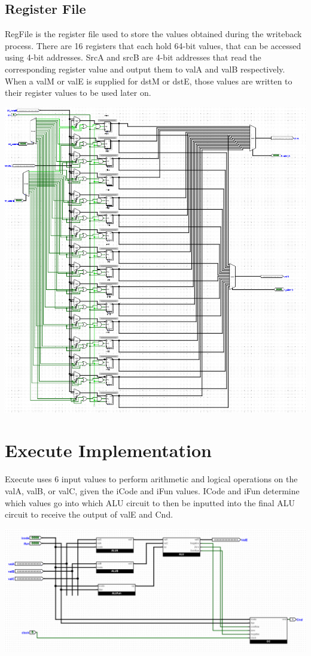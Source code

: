 \documentclass{article}
\begin{document}
\subsection{Register File}
RegFile is the register file used to store the values obtained during the writeback process. There are 16 registers that each hold 64-bit values, that can be accessed using 4-bit addresses. SrcA and srcB are 4-bit addresses that read the corresponding register value and output them to valA and valB respectively. When a valM or valE is supplied for dstM or dstE, those values are written to their register values to be used later on. 
\begin{center}
    \includegraphics[scale=.6]{regFile.png} \\
\end{center}
\pagebreak
\section{Execute Implementation}
Execute uses 6 input values to perform arithmetic and logical operations on the valA, valB, or valC, given the iCode and iFun values. ICode and iFun determine which values go into which ALU circuit to then be inputted into the final ALU circuit to receive the output of valE and Cnd. 
\begin{center}
    \includegraphics[scale=.4]{execute.png} \\
\end{center}
\end{document}
